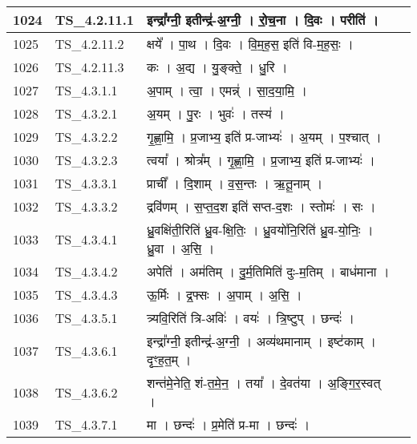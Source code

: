 \documentclass[17pt]{extarticle}
\begin{document}
\begin{longtable}{||p{0.4in}||p{0.9in}||p{4.0in}||p{0.9in}||}
        \hline
            1024 & TS\_4.2.11.1 & इन्द्रा᳚ग्नी॒ इतीन्द्र॑{-}अ॒ग्नी॒   ।   रो॒च॒ना   ।   दि॒वः   ।   परीति॑   ।    &      \\
        \hline
            1025 & TS\_4.2.11.2 & क्षये᳚   ।   पा॒थ   ।   दि॒वः   ।   वि॒म॒ह॒स॒ इति॑ वि{-}म॒ह॒सः॒   ।    &      \\
        \hline
            1026 & TS\_4.2.11.3 & कः   ।   अ॒द्य   ।   यु॒ङ्क्ते॒   ।   धु॒रि   ।    &      \\
        \hline
            1027 & TS\_4.3.1.1 & अ॒पाम्   ।   त्वा॒   ।   एमन्न्॑   ।   सा॒द॒या॒मि॒   ।    &      \\
        \hline
            1028 & TS\_4.3.2.1 & अ॒यम्   ।   पु॒रः   ।   भुवः॑   ।   तस्य॑   ।    &      \\
        \hline
            1029 & TS\_4.3.2.2 & गृ॒ह्णा॒मि॒   ।   प्र॒जाभ्य॒ इति॑ प्र{-}जाभ्यः॑   ।   अ॒यम्   ।   प॒श्चात्   ।    &      \\
        \hline
            1030 & TS\_4.3.2.3 & त्वया᳚   ।   श्रोत्र᳚म्   ।   गृ॒ह्णा॒मि॒   ।   प्र॒जाभ्य॒ इति॑ प्र{-}जाभ्यः॑   ।    &      \\
        \hline
            1031 & TS\_4.3.3.1 & प्राची᳚   ।   दि॒शाम्   ।   व॒स॒न्तः   ।   ऋ॒तू॒नाम्   ।    &      \\
        \hline
            1032 & TS\_4.3.3.2 & द्रवि॑णम्   ।   स॒प्त॒द॒श इति॑ सप्त{-}द॒शः   ।   स्तोमः॑   ।   सः   ।    &      \\
        \hline
            1033 & TS\_4.3.4.1 & ध्रु॒वक्षि॑ती॒रिति॑ ध्रु॒व{-}क्षि॒तिः॒   ।   ध्रु॒वयो॑नि॒रिति॑ ध्रु॒व{-}यो॒निः॒   ।   ध्रु॒वा   ।   अ॒सि॒   ।    &      \\
        \hline
            1034 & TS\_4.3.4.2 & अपेति॑   ।   अम॑तिम्   ।   दु॒र्म॒तिमिति॑ दुः{-}म॒तिम्   ।   बाध॑माना   ।    &      \\
        \hline
            1035 & TS\_4.3.4.3 & ऊ॒र्मिः   ।   द्र॒फ्सः   ।   अ॒पाम्   ।   अ॒सि॒   ।    &      \\
        \hline
            1036 & TS\_4.3.5.1 & त्र्यवि॒रिति॑ त्रि{-}अविः॑   ।   वयः॑   ।   त्रि॒ष्टुप्   ।   छन्दः॑   ।    &      \\
        \hline
            1037 & TS\_4.3.6.1 & इन्द्रा᳚ग्नी॒ इतीन्द्र॑{-}अ॒ग्नी॒   ।   अव्य॑थमानाम्   ।   इष्ट॑काम्   ।   दृꣳ॒॒ह॒त॒म्   ।    &      \\
        \hline
            1038 & TS\_4.3.6.2 & शन्त॑मे॒नेति॒ शं{-}त॒मे॒न॒   ।   तया᳚   ।   दे॒वत॑या   ।   अ॒ङ्गि॒र॒स्वत्   ।    &      \\
        \hline
            1039 & TS\_4.3.7.1 & मा   ।   छन्दः॑   ।   प्र॒मेति॑ प्र{-}मा   ।   छन्दः॑   ।    &      \\

\end{longtable}
\end{document}
